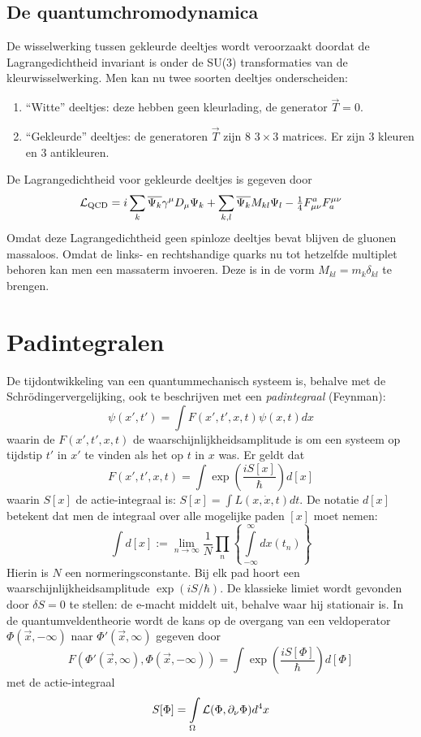 \subsection[~~De quantumchromodynamica]{De quantumchromodynamica}
De wisselwerking tussen gekleurde deeltjes wordt veroorzaakt doordat de
Lagrangedichtheid invariant is onder de SU(3) transformaties van de
kleurwisselwerking. Men kan nu twee soorten deeltjes onderscheiden:
\begin{enumerate}
\item ``Witte'' deeltjes: deze hebben geen kleurlading, de generator $\vec{T}=0$.
\item ``Gekleurde'' deeltjes: de generatoren $\vec{T}$ zijn 8 $3\times3$
      matrices. Er zijn 3 kleuren en 3 antikleuren.
\end{enumerate}
De Lagrangedichtheid voor gekleurde deeltjes is gegeven door
\[
{\cal L}_{\rm QCD}=i\sum_k\overline{\Psi_k}\gamma^\mu D_\mu\Psi_k+
\sum_{k,l}\overline{\Psi_k}M_{kl}\Psi_l-\mbox{$\frac{1}{4}$} F^a_{\mu\nu}F_a^{\mu\nu}
\]
Omdat deze Lagrangedichtheid geen spinloze deeltjes bevat blijven de
gluonen massaloos. Omdat de links- en rechtshandige quarks nu tot hetzelfde
multiplet behoren kan men een massaterm invoeren. Deze is in de vorm
$M_{kl}=m_k\delta_{kl}$ te brengen.

\section[~~Padintegralen]{Padintegralen}
De tijdontwikkeling van een quantummechanisch systeem is, behalve met de
Schr\"odingervergelijking, ook te beschrijven met een {\it padintegraal}
(Feynman):
\[
\psi(x',t')=\int F(x',t',x,t)\psi(x,t)dx
\]
waarin de $F(x',t',x,t)$ de waarschijnlijkheidsamplitude is om een systeem op
tijdstip $t'$ in $x'$ te vinden als het op $t$ in $x$ was. Er geldt dat
\[
F(x',t',x,t)=\int\exp\left(\frac{iS[x]}{\hbar}\right)d[x]
\]
waarin $S[x]$ de actie-integraal is: $S[x]=\int L(x,\dot{x},t)dt$. De notatie
$d[x]$ betekent dat men de integraal over alle mogelijke paden $[x]$ moet
nemen:
\[
\int d[x]:=\lim_{n\rightarrow\infty}\frac{1}{N}\prod_n\left\{\int\limits_{-\infty}^\infty dx(t_n)\right\}
\]
Hierin is $N$ een normeringsconstante. Bij elk pad hoort een
waarschijnlijkheidsamplitude $\exp(iS/\hbar)$. De klassieke limiet wordt
gevonden door $\delta S=0$ te stellen: de e-macht middelt uit, behalve waar
hij stationair is. In de quantumveldentheorie wordt de kans op de overgang
van een veldoperator $\Phi(\vec{x},-\infty)$ naar $\Phi'(\vec{x},\infty)$
gegeven door
\[
F(\Phi'(\vec{x},\infty),\Phi(\vec{x},-\infty))=\int\exp\left(\frac{iS[\Phi]}{\hbar}\right)d[\Phi]
\]
met de actie-integraal
\[
S[\Phi]=\int\limits_\Omega {\cal L}(\Phi,\partial_\nu\Phi)d^4x
\]

